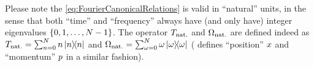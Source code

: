 
\noindent{\color{red} \rule{\linewidth}{1pt}}  %

Please note the \eqref{eq:FourierCanonicalRelations} is valid in ``natural'' units,
in the sense that
both ``time'' and ``frequency'' 
always have (and only have) integer eigenvalues $\left\{0, 1, \dots, N-1\right\}$.
The operator ${T}_{\mathrm{nat.}}$ and ${\Omega}_{\mathrm{nat.}}$ are defined indeed as
${T}_{\mathrm{nat.}} = \sum_{n=0}^{N} n \ketbra{n}$ and
${\Omega}_{\mathrm{nat.}} = \sum_{\omega=0}^{N} \omega \ketbra{\omega}$
(\citereset\cite{FiniteHilb} defines ``position'' ${x}$ and ``momentum'' ${p}$ in a similar fashion).

